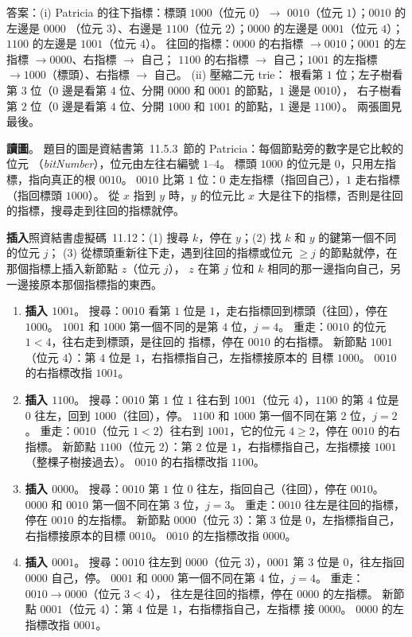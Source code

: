 \begin{pastsoln}
答案：(i) Patricia 的往下指標：標頭 $1000$（位元 $0$）$\to$ $0010$（位元 $1$）；$0010$ 的左邊是 $0000$
（位元 $3$）、右邊是 $1100$（位元 $2$）；$0000$ 的左邊是 $0001$（位元 $4$）；$1100$ 的左邊是 $1001$（位元
$4$）。 往回的指標：$0000$ 的右指標 $\to 0010$；$0001$ 的左指標 $\to 0000$、右指標 $\to$ 自己；
$1100$ 的右指標 $\to$ 自己；$1001$ 的左指標 $\to 1000$（標頭）、右指標 $\to$ 自己。 (ii) 壓縮二元 trie：
根看第 $1$ 位；左子樹看第 $3$ 位（$0$ 邊是看第 $4$ 位、分開 $0000$ 和 $0001$ 的節點，$1$ 邊是 $0010$），
右子樹看第 $2$ 位（$0$ 邊是看第 $4$ 位、分開 $1000$ 和 $1001$ 的節點，$1$ 邊是 $1100$）。 兩張圖見最後。

\textbf{讀圖}。 題目的圖是資結書第~11.5.3~節的 Patricia：每個節點旁的數字是它比較的位元
（\textit{bitNumber}），位元由左往右編號 $1$--$4$。 標頭 $1000$ 的位元是 $0$，只用左指標，指向真正的根
$0010$。 $0010$ 比第 $1$ 位：$0$ 走左指標（指回自己），$1$ 走右指標（指回標頭 $1000$）。 從 $x$ 指到
$y$ 時，$y$ 的位元比 $x$ 大是往下的指標，否則是往回的指標，搜尋走到往回的指標就停。

\textbf{插入}照資結書虛擬碼~11.12：(1) 搜尋 $k$，停在 $y$；(2) 找 $k$ 和 $y$ 的鍵第一個不同的位元 $j$；
(3) 從標頭重新往下走，遇到往回的指標或位元 $\ge j$ 的節點就停，在那個指標上插入新節點 $z$（位元 $j$），
$z$ 在第 $j$ 位和 $k$ 相同的那一邊指向自己，另一邊接原本那個指標指的東西。
\begin{enumerate}
\item \textbf{插入 $1001$}。 搜尋：$0010$ 看第 $1$ 位是 $1$，走右指標回到標頭（往回），停在 $1000$。
$1001$ 和 $1000$ 第一個不同的是第 $4$ 位，$j = 4$。 重走：$0010$ 的位元 $1 < 4$，往右走到標頭，是往回的
指標，停在 $0010$ 的右指標。 新節點 $1001$（位元 $4$）：第 $4$ 位是 $1$，右指標指自己，左指標接原本的
目標 $1000$。 $0010$ 的右指標改指 $1001$。
\item \textbf{插入 $1100$}。 搜尋：$0010$ 第 $1$ 位 $1$ 往右到 $1001$（位元 $4$），$1100$ 的第 $4$ 位是
$0$ 往左，回到 $1000$（往回），停。 $1100$ 和 $1000$ 第一個不同在第 $2$ 位，$j = 2$。 重走：$0010$（位元
$1 < 2$）往右到 $1001$，它的位元 $4 \ge 2$，停在 $0010$ 的右指標。 新節點 $1100$（位元 $2$）：第 $2$ 位是
$1$，右指標指自己，左指標接 $1001$（整棵子樹接過去）。 $0010$ 的右指標改指 $1100$。
\item \textbf{插入 $0000$}。 搜尋：$0010$ 第 $1$ 位 $0$ 往左，指回自己（往回），停在 $0010$。 $0000$ 和
$0010$ 第一個不同在第 $3$ 位，$j = 3$。 重走：$0010$ 往左是往回的指標，停在 $0010$ 的左指標。 新節點
$0000$（位元 $3$）：第 $3$ 位是 $0$，左指標指自己，右指標接原本的目標 $0010$。 $0010$ 的左指標改指 $0000$。
\item \textbf{插入 $0001$}。 搜尋：$0010$ 往左到 $0000$（位元 $3$），$0001$ 第 $3$ 位是 $0$，往左指回
$0000$ 自己，停。 $0001$ 和 $0000$ 第一個不同在第 $4$ 位，$j = 4$。 重走：$0010 \to 0000$（位元 $3 < 4$），
往左是往回的指標，停在 $0000$ 的左指標。 新節點 $0001$（位元 $4$）：第 $4$ 位是 $1$，右指標指自己，左指標
接 $0000$。 $0000$ 的左指標改指 $0001$。
\end{enumerate}


\end{pastsoln}

